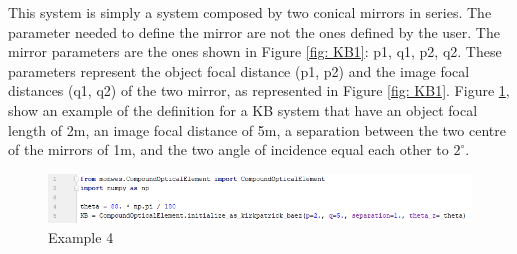 %
This system is simply a system composed by two  conical mirrors in series. The parameter needed to define the mirror are not the ones defined by the user. The mirror parameters are the ones shown in Figure \ref{fig: KB1}: p1, q1, p2, q2. These parameters represent the object focal distance (p1, p2) and the image focal distances (q1, q2) of the two mirror, as represented in Figure \ref{fig: KB1}. Figure \ref{fig: CodeKB}, show an example of the definition for a KB system that have an object focal length of 2m, an image focal distance of 5m, a separation between the two centre  of the mirrors of 1m, and the two angle of incidence equal each other to $2^{\circ} $.
\begin{figure}[H]
%
\centering
%
\includegraphics[width=1.\textwidth]{Immagini/Chapter3/CodeKB}
%
\caption{Example 4}
%
\label{fig: CodeKB}
%
\end{figure}
